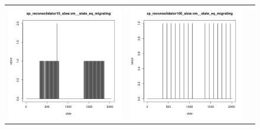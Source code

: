 \documentclass[parallelisme]{compas2017}
\begin{document}
\begin{figure}[]
\begin{tabular}{ccc}
\includegraphics[scale=0.30]{xp_reconsolidator10_slow_vm__state_eq_migrating}&
\includegraphics[scale=0.30]{xp_reconsolidator100_slow_vm__state_eq_migrating}\\
	\end{tabular}
	\label{output}
\end{figure}
\end{document}
